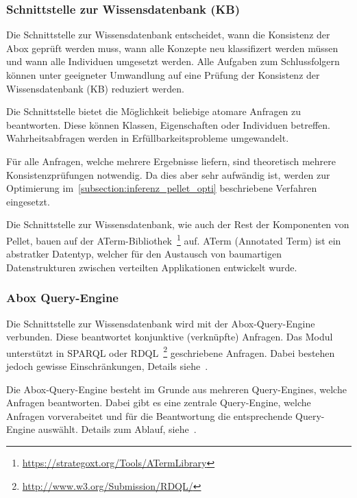 \subsubsection{Schnittstelle zur Wissensdatenbank (KB)}
\label{ssubsection:inferenz_pellet_kb}
Die Schnittstelle zur Wissensdatenbank entscheidet, wann die Konsistenz der Abox geprüft werden muss, wann alle Konzepte neu klassifizert werden müssen und wann alle Individuen umgesetzt werden. Alle Aufgaben zum Schlussfolgern können unter geeigneter Umwandlung auf eine Prüfung der Konsistenz der Wissensdatenbank (KB) reduziert werden.

Die Schnittstelle bietet die Möglichkeit beliebige atomare Anfragen zu beantworten. Diese können Klassen, Eigenschaften oder Individuen betreffen. Wahrheitsabfragen werden in Erfüllbarkeitsprobleme umgewandelt.

Für alle Anfragen, welche mehrere Ergebnisse liefern, sind theoretisch mehrere Konsistenzprüfungen notwendig. Da dies aber sehr aufwändig ist, werden zur Optimierung im~\autoref{subsection:inferenz_pellet_opti} beschriebene Verfahren eingesetzt.

Die Schnittstelle zur Wissensdatenbank, wie auch der Rest der Komponenten von Pellet, bauen auf der ATerm-Bibliothek~\footnote{\url{https://strategoxt.org/Tools/ATermLibrary}} auf. ATerm (Annotated Term) ist ein abstratker Datentyp, welcher für den Austausch von baumartigen Datenstrukturen zwischen verteilten Applikationen entwickelt wurde.

\subsubsection{Abox Query-Engine}
\label{ssubsection:inferenz_pellet_aboxquery}
Die Schnittstelle zur Wissensdatenbank wird mit der Abox-Query-Engine verbunden. Diese beantwortet konjunktive (verknüpfte) Anfragen. Das Modul unterstützt in SPARQL oder RDQL~\footnote{\url{http://www.w3.org/Submission/RDQL/}} geschriebene Anfragen. Dabei bestehen jedoch gewisse Einschränkungen, Details siehe~\cite[S. 10 - 11]{sirin:pellet05}.

Die Abox-Query-Engine besteht im Grunde aus mehreren Query-Engines, welche Anfragen beantworten. Dabei gibt es eine zentrale Query-Engine, welche Anfragen vorverabeitet und für die Beantwortung die entsprechende Query-Engine auswählt. Details zum Ablauf, siehe~\cite[S. 11]{sirin:pellet05}.

